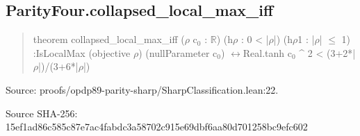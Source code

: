 \documentclass[11pt,a4paper]{article}
\begin{document}
\begin{samepage}
\subsection{ParityFour.collapsed\_local\_max\_iff}
\begin{quote}\small\ttfamily theorem collapsed\_local\_max\_iff (\ensuremath{\rho} c\ensuremath{_0} : \ensuremath{\mathbb{R}}) (h\ensuremath{\rho} : 0 < |\ensuremath{\rho}|) (h\ensuremath{\rho}1 : |\ensuremath{\rho}| \ensuremath{\leq} 1) :\newline     IsLocalMax (objective \ensuremath{\rho}) (nullParameter c\ensuremath{_0}) \ensuremath{\leftrightarrow}\newline       Real.tanh c\ensuremath{_0} \textasciicircum{} 2 < (3+2*|\ensuremath{\rho}|)/(3+6*|\ensuremath{\rho}|)\end{quote}
{\small Source: proofs/opdp89-parity-sharp/SharpClassification.lean:22.\par}

{\small Source SHA-256: 15ef1ad86c585c87e7ac4fabdc3a58702c915e69dbf6aa80d701258bc9efc602\par}

\end{samepage}
\end{document}
